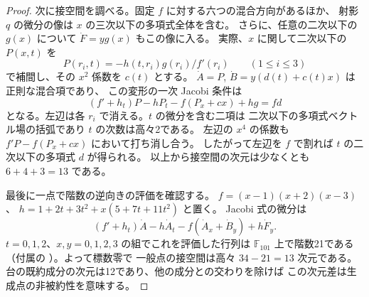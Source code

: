 \begin{proof}
次に接空間を調べる。固定 $f$ に対する六つの混合方向があるほか、
射影 $q$ の微分の像は $x$ の三次以下の多項式全体を含む。
さらに、任意の二次以下の $g(x)$ について $\dot F=y g(x)$ もこの像に入る。
実際、$x$ に関して二次以下の $P(x,t)$ を
\[
 P(r_i,t)=-h(t,r_i)g(r_i)/f'(r_i)\qquad (1\le i\le3)
\]
で補間し、その $x^2$ 係数を $c(t)$ とする。
$\dot A=P$, $\dot B=y(d(t)+c(t)x)$ は正則な混合項であり、
この変形の一次 Jacobi 条件は
\[
 (f'+h_t)P-hP_t-f(P_x+c x)+h g=f d
\]
となる。左辺は各 $r_i$ で消える。$t$ の微分を含む二項は
二次以下の多項式ベクトル場の括弧であり $t$ の次数は高々2である。
左辺の $x^4$ の係数も $f'P-f(P_x+c x)$ において打ち消し合う。
したがって左辺を $f$ で割れば $t$ の二次以下の多項式 $d$ が得られる。
以上から接空間の次元は少なくとも $6+4+3=13$ である。

最後に一点で階数の逆向きの評価を確認する。
$f=(x-1)(x+2)(x-3)$、
$h=1+2t+3t^2+x(5+7t+11t^2)$ と置く。
Jacobi 式の微分は
\[
 (f'+h_t)\dot A-h\dot A_t-f(\dot A_x+\dot B_y)+h\dot F_y .
\]
$t=0,1,2$、$x,y=0,1,2,3$ の組でこれを評価した行列は
$\mathbb F_{101}$ 上で階数21である
（付属の ）。よって標数零で
一般点の接空間は高々 $34-21=13$ 次元である。
台の既約成分の次元は12であり、他の成分との交わりを除けば
この次元差は生成点の非被約性を意味する。
\end{proof}

